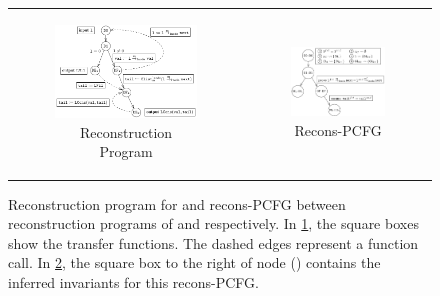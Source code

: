 \begin{figure}[t]
\begin{tabular}{cc}
\begin{subfigure}[b]{0.52\textwidth}
\includegraphics[scale=0.8]{chapters/figures/figClistCfg.pdf}
\vspace{20px}
\caption{\label{fig:reconsProg}Reconstruction Program}
\end{subfigure}%
&
\begin{subfigure}[b]{0.48\textwidth}
\includegraphics[scale=0.9]{chapters/figures/figClistProductCfg.pdf}
\vspace{20px}
\caption{\label{fig:reconsPCFG}Recons-PCFG}
\end{subfigure}%
\\
\end{tabular}
\caption{\label{fig:recons}Reconstruction program for  and recons-PCFG between reconstruction programs of  and  respectively.
In \cref{fig:reconsProg}, the square boxes show the transfer functions. The dashed edges represent a function call. In \cref{fig:reconsPCFG}, the square box to the right of node () contains the inferred invariants for this recons-PCFG.}
\end{figure}
